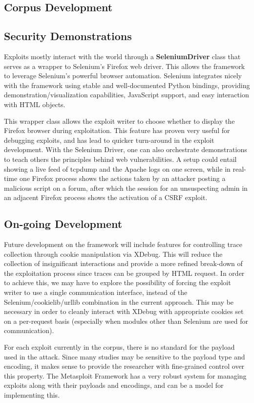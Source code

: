 \documentclass[letterpaper,twocolumn,10pt]{article}
\begin{document}
\subsection{Corpus Development}



\subsection{Security Demonstrations}

Exploits mostly interact with the world through a {\bf SeleniumDriver} class that serves as a wrapper to Selenium's Firefox web driver. This allows the framework to leverage Selenium's powerful browser automation. Selenium integrates nicely with the framework using stable and well-documented Python bindings, providing demonstration/visualization capabilities, JavaScript support, and easy interaction with HTML objects.\par
This wrapper class allows the exploit writer to choose whether to display the Firefox browser during exploitation. This feature has proven very useful for debugging exploits, and has lead to quicker turn-around in the exploit development. With the Selenium Driver, one can also orchestrate demonstrations to teach others the principles behind web vulnerabilities.  A setup could entail showing a live feed of tcpdump and the Apache logs on one screen, while in real-time one Firefox process shows the actions taken by an attacker posting a malicious script on a forum, after which the session for an unsuspecting admin in an adjacent Firefox process shows the activation of a CSRF exploit. 

\subsection{On-going Development}
  Future development on the framework will include features for controlling trace collection through cookie manipulation via XDebug. This will reduce the collection of insignificant interactions and provide a more refined break-down of the exploitation process since traces can be grouped by HTML request. In order to achieve this, we may have to explore the possibility of forcing the exploit writer to use a single communication interface, instead of the Selenium/cookielib/urllib combination in the current approach. This may be necessary in order to cleanly interact with XDebug with appropriate cookies set on a per-request basis (especially when modules other than Selenium are used for communication).\par
For each exploit currently in the corpus, there is no standard for the payload used in the attack. Since many studies may be sensitive to the payload type and encoding, it makes sense to provide the researcher with fine-grained control over this property. The Metasploit Framework has a very robust system for managing exploits along with their payloads and encodings, and can be a model for implementing this.
\end{document}
